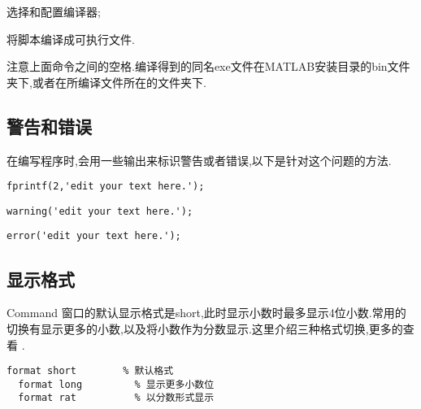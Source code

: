  \begindot
  \item {} 选择和配置编译器;
  \item {} 将脚本编译成可执行文件.
 \myenddot

注意上面命令之间的空格.编译得到的同名exe文件在MATLAB安装目录的bin文件夹下,或者在所编译文件所在的文件夹下.



\subsection{警告和错误}
在编写程序时,会用一些输出来标识警告或者错误,以下是针对这个问题的方法.

\vspace{-0.8cm}
\begin{lstlisting}[caption = 红色字符串输出]
fprintf(2,'edit your text here.');
\end{lstlisting}


\vspace{-0.8cm}
\begin{lstlisting}[caption = 警告输出]
warning('edit your text here.');
\end{lstlisting}

\vspace{-0.8cm}
\begin{lstlisting}[caption = 错误输出]
error('edit your text here.');
\end{lstlisting}



\subsection{显示格式}
Command 窗口的默认显示格式是short,此时显示小数时最多显示4位小数.常用的切换有显示更多的小数,以及将小数作为分数显示.这里介绍三种格式切换,更多的查看 .

\vspace{-0.8cm}
\begin{lstlisting}[caption = Command窗口显示格式]
  format short        % 默认格式
  format long         % 显示更多小数位
  format rat          % 以分数形式显示
\end{lstlisting}